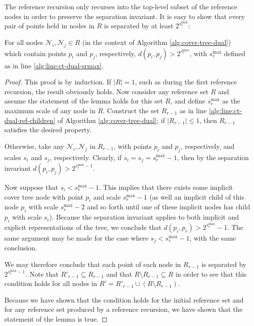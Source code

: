 The reference recursion only recurses into the top-level subset of the reference
nodes in order to preserve the separation invariant.  It is easy to show that
every pair of points held in nodes in $R$ is separated by at least
$2^{s_r^{\max}}$:

\begin{lemma}
For all nodes $\mathscr{N}_i, \mathscr{N}_j \in R$ (in the context of Algorithm
\ref{alg:cover-tree-dual}) which contain points $p_i$ and $p_j$, respectively,
$d(p_i, p_j) > 2^{s_r^{\max}}$, with $s_r^{\max}$ defined as in line
\ref{alg:line:ct-dual-srmax}.
\end{lemma}

\begin{proof}
This proof is by induction.  If $|R| = 1$, such as during the first reference
recursion, the result obviously holds.  Now consider any reference set $R$ and
assume the statement of the lemma holds for this set $R$, and define
$s_r^{\max}$ as the maximum scale of any node in $R$.  Construct the set
$R_{r - 1}$ as in line \ref{alg:line:ct-dual-ref-children} of Algorithm
\ref{alg:cover-tree-dual}; if $| R_{r - 1} | \le 1$, then $R_{r - 1}$ satisfies
the desired property.

Otherwise, take any $\mathscr{N}_i, \mathscr{N}_j$ in $R_{r - 1}$, with points
$p_i$ and $p_j$, respectively, and scales $s_i$ and $s_j$, respectively.
Clearly, if $s_i = s_j = s_r^{\max} - 1$, then by the separation invariant
$d(p_i, p_j) > 2^{s_r^{\max} - 1}$.

Now suppose that $s_i < s_r^{\max} - 1$.  This implies that there exists some
implicit cover tree node with point $p_i$ and scale $s_r^{\max} - 1$ (as well an
implicit child of this node $p_i$ with scale $s_r^{\max} - 2$ and so forth until
one of these implicit nodes has child $p_i$ with scale $s_i$).  Because the
separation invariant applies to both implicit and explicit representations of
the tree, we conclude that $d(p_i, p_r) > 2^{s_r^{\max}} - 1$.  The same
argument may be made for the case where $s_j < s_r^{\max} - 1$, with the same
conclusion.

We may therefore conclude that each point of each node in $R_{r - 1}$ is
separated by $2^{s_r^{\max} - 1}$.  Note that $R'_{r - 1} \subseteq R_{r - 1}$
and that $R \setminus R_{r - 1} \subseteq R$ in order to see that this condition
holds for all nodes in $R' = R'_{r - 1} \cup (R \setminus R_{r - 1})$.

Because we have shown that the condition holds for the initial reference set and
for any reference set produced by a reference recursion, we have shown that the
statement of the lemma is true.
\end{proof}

